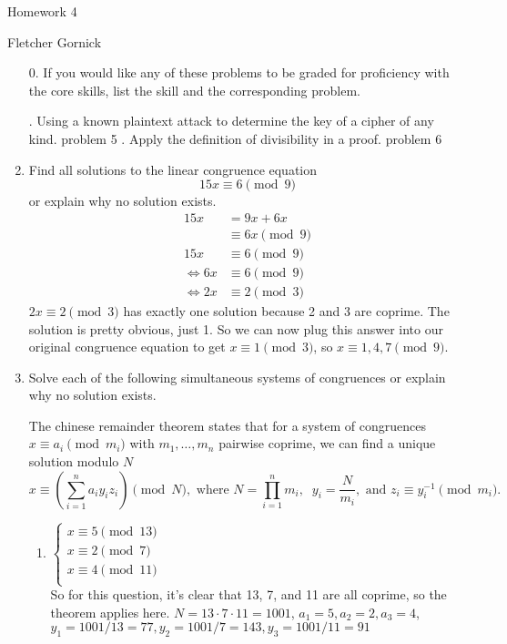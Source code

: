 \documentclass[11pt]{article}
\newcommand{\n}{\vspace{0.5cm}}
\begin{document}
  \begin{center}
    {\Large Homework 4} \n

    Fletcher Gornick
  \end{center}

  \begin{enumerate}
    \item[0.] If you would like any of these problems to be graded for proficiency with the core skills, list the skill and the corresponding problem.
      \begin{outline}
        . Using a known plaintext attack to determine the key of a cipher of any kind.
          \2 problem 5
        . Apply the definition of divisibility in a proof.
          \2 problem 6
      \end{outline} \n

    \item Find all solutions to the linear congruence equation \[15x \equiv 6 \pmod 9\] or explain why no solution exists.
      \begin{align*}
        15x      &= 9x + 6x \\
                 &\equiv 6x \pmod 9 \\
        15x      &\equiv 6 \pmod 9 \\
        \iff 6x  &\equiv 6 \pmod 9 \\
        \iff 2x  &\equiv 2 \pmod 3
      \end{align*}
      \(2x \equiv 2 \pmod 3\) has exactly one solution because 2 and 3 are coprime.  The solution is pretty obvious, just 1.  So we can now plug this answer into our original congruence equation to get \(x \equiv 1 \pmod 3\), so \(x \equiv 1,4,7 \pmod 9\).

    \item Solve each of the following simultaneous systems of congruences or explain why no solution exists.

          The chinese remainder theorem states that for a system of congruences \(x \equiv a_i \pmod{m_i}\) with \(m_1, \hdots, m_n\) pairwise coprime, we can find a unique solution modulo \(N\)
          \[x \equiv \left( \sum_{i=1}^{n} a_iy_iz_i \right) \pmod{N}, \text{ where } N = \prod_{i=1}^{n} m_i, \;\; y_i = \frac{N}{m_i}, \text{ and } z_i \equiv y_i^{-1} \pmod{m_i}.\]
      \begin{enumerate}
        \item \(\begin{cases}
            x \equiv 5 \pmod{13} \\
            x \equiv 2 \pmod{7} \\
            x \equiv 4 \pmod{11} \\
          \end{cases}\) \n\\
          So for this question, it's clear that 13, 7, and 11 are all coprime, so the theorem applies here.  \(N = 13 \cdot 7 \cdot 11 = 1001\), \(a_1 = 5, a_2 = 2, a_3 = 4\), \(y_1 = 1001/13 = 77, y_2 = 1001/7 = 143, y_3 = 1001/11 = 91\)


\end{enumerate}
\end{enumerate}
\end{document}
